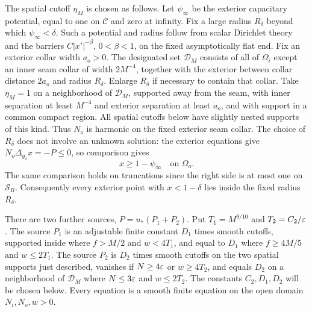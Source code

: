 The spatial cutoff $\eta_M$ is chosen as follows. Let $\psi_\infty$
be the exterior capacitary potential, equal to one on $\mathcal C$ and
zero at infinity. Fix a large radius $R_\delta$ beyond which
$\psi_\infty<\delta$. Such a potential and radius follow from scalar
Dirichlet theory and the barriers $C|x'|^{-\beta}$, $0<\beta<1$,
on the fixed asymptotically flat end. Fix an exterior collar width
$a_o>0$. The designated set $\mathcal D_M$ consists of all of
$\Omega_i$ except an inner seam collar of width $2M^{-4}$, together
with the exterior between collar distance $2a_o$ and radius
$R_\delta$. Enlarge $R_\delta$ if necessary to contain that collar.
Take $\eta_M=1$ on a neighborhood of $\mathcal D_M$, supported away
from the seam, with inner separation at least $M^{-4}$ and exterior
separation at least $a_o$, and with support in a common compact region.
All spatial cutoffs below have slightly nested supports of this kind.
Thus $N_o$ is harmonic on the fixed exterior seam collar. The choice of
$R_\delta$ does not involve an unknown solution: the exterior equations
give $N_o\Delta_{g_o}x=-P\le0$, so comparison gives
\begin{equation}\label{eq:compact-capacity-comparison}
 x\ge1-\psi_\infty \quad\text{on }\Omega_o.
\end{equation}
The same comparison holds on truncations since the right side is at
most one on $\mathcal S_R$. Consequently every exterior point with
$x<1-\delta$ lies inside the fixed radius $R_\delta$.

There are two further sources, $P=u_*(P_1+P_2)$. Put
$T_1=M^{9/10}$ and $T_2=C_2/\varepsilon$. The source $P_1$ is an adjustable
finite constant $D_1$ times smooth cutoffs, supported inside where
$f>M/2$ and $w<4T_1$, and equal to $D_1$ where
$f\ge4M/5$ and $w\le2T_1$. The source $P_2$ is $D_2$ times smooth
cutoffs on the two spatial supports just described, vanishes if
$N\ge4\varepsilon$ or $w\ge4T_2$, and equals $D_2$ on a neighborhood of
$\mathcal D_M$ where $N\le3\varepsilon$ and $w\le2T_2$.
The constants $C_2,D_1,D_2$ will be chosen below. Every equation is a
smooth finite equation on the open domain $N_i,N_o,w>0$.

